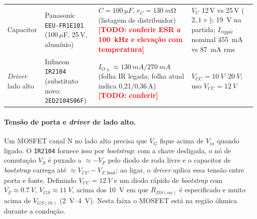\documentclass[11pt,a4paper]{article}
\newcommand{\TODO}[1]{\textcolor{red}{\textbf{[TODO: #1]}}}
\begin{document}
\begin{table}[h]
\begin{tabularx}{\linewidth}{@{}>{\raggedright\arraybackslash}p{2.1cm} >{\raggedright\arraybackslash}p{2.6cm} >{\raggedright\arraybackslash}X >{\raggedright\arraybackslash}X@{}}
Capacitor & Panasonic \texttt{EEU-FR1E101}~\cite{ds_eeufr} (100\,$\mu$F, 25\,V, alum\'inio) &
 $C=\SI{100}{\micro F}$, $r_C=\SI{130}{m\ohm}$ (listagem de distribuidor) \TODO{conferir ESR a \SI{100}{kHz} e eleva\c{c}\~ao com temperatura} &
 $V_C$ 12\,V vs 25\,V ($2{,}1\times$); \SI{19}{V} na partida; $I_{ripple}$ nominal \SI{455}{mA} vs \SI{87}{mA} rms \\
\emph{Driver} lado alto & Infineon \texttt{IR2104}~\cite{ds_ir2104} (substituto novo: \texttt{2ED2104S06F}) &
 $I_{O\pm}\approx\SI{130}{mA}/\SI{270}{mA}$ (folha IR legada; folha atual indica 0,21/0,36\,A) \TODO{conferir} &
 $V_{CC}=\SIrange{10}{20}{V}$; uso $V_{CC}=\SI{12}{V}$ \\ \bottomrule
\end{tabularx}
\end{table}

\paragraph{Tens\~ao de porta e \emph{driver} de lado alto.} Um MOSFET canal N no lado alto precisa que $V_G$ fique acima de $V_{in}$ quando ligado. O \texttt{IR2104} fornece isso por \emph{bootstrap}: com a chave desligada, o n\'o de comuta\c{c}\~ao $V_S$ \'e puxado a $\approx-V_F$ pelo diodo de roda livre e o capacitor de \emph{bootstrap} carrega at\'e $\approx V_{CC}-V_{F,boot}$; ao ligar, o \emph{driver} aplica essa tens\~ao entre porta e fonte. Definindo $V_{CC}=\SI{12}{V}$ e um diodo r\'apido de \emph{bootstrap} com $V_F\approx\SI{0,7}{V}$, $V_{GS}\approx\SI{11}{V}$, acima dos \SI{10}{V} em que $R_{DS(on)}$ \'e especificado e muito acima de $V_{GS(th)}$ (\SIrange{2}{4}{V}). Nesta faixa o MOSFET est\'a na regi\~ao \'ohmica durante a condu\c{c}\~ao.
\end{document}
